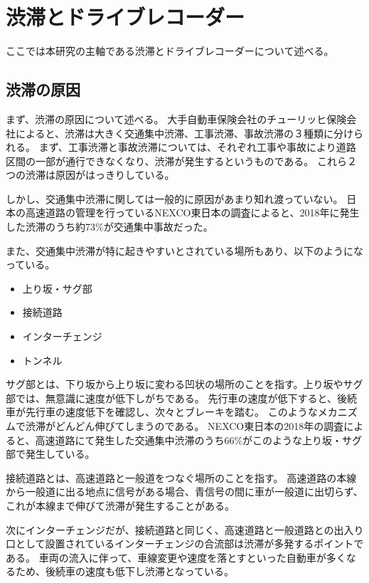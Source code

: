\chapter{渋滞とドライブレコーダー}
ここでは本研究の主軸である渋滞とドライブレコーダーについて述べる。
\section{渋滞の原因}
まず、渋滞の原因について述べる。
大手自動車保険会社のチューリッヒ保険会社によると、渋滞は大きく交通集中渋滞、工事渋滞、事故渋滞の３種類に分けられる\cite{zurich}。
まず、工事渋滞と事故渋滞については、それぞれ工事や事故により道路区間の一部が通行できなくなり、渋滞が発生するというものである。
これら２つの渋滞は原因がはっきりしている。

しかし、交通集中渋滞に関しては一般的に原因があまり知れ渡っていない。
日本の高速道路の管理を行っているNEXCO東日本の調査によると、2018年に発生した渋滞のうち約73\%が交通集中事故だった\cite{NEXCOeast}。

また、交通集中渋滞が特に起きやすいとされている場所もあり、以下のようになっている。

\begin{itemize}
  \item 上り坂・サグ部
  \item 接続道路
  \item インターチェンジ
  \item トンネル
\end{itemize}

サグ部とは、下り坂から上り坂に変わる凹状の場所のことを指す。上り坂やサグ部では、無意識に速度が低下しがちである。
先行車の速度が低下すると、後続車が先行車の速度低下を確認し、次々とブレーキを踏む。
このようなメカニズムで渋滞がどんどん伸びてしまうのである。
NEXCO東日本の2018年の調査によると、高速道路にて発生した交通集中渋滞のうち66\%がこのような上り坂・サグ部で発生している\cite{NEXCOeast}。

接続道路とは、高速道路と一般道をつなぐ場所のことを指す。
高速道路の本線から一般道に出る地点に信号がある場合、青信号の間に車が一般道に出切らず、これが本線まで伸びて渋滞が発生することがある\cite{zurich}。

次にインターチェンジだが、接続道路と同じく、高速道路と一般道路との出入り口として設置されているインターチェンジの合流部は渋滞が多発するポイントである\cite{zurich}。
車両の流入に伴って、車線変更や速度を落とすといった自動車が多くなるため、後続車の速度も低下し渋滞となっている。

